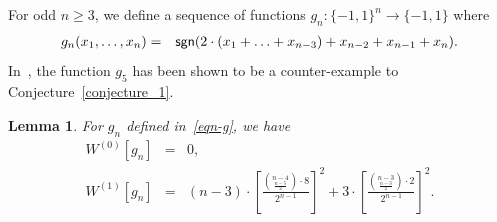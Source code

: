 \documentclass[11pt]{article}
\newtheorem{lemma} {Lemma}
\newcommand{\sym}[1]{{\sf #1}}
\begin{document}
For odd $n\geq 3$, we define a sequence of functions $g_n:\{-1,1\}^n\rightarrow\{-1,1\}$ where
\begin{eqnarray}\label{eqn-g}
	g_{n}(x_1,\ldots,x_n) & = & \sym{sgn}(2\cdot(x_1+\ldots+x_{n-3})+x_{n-2}+x_{n-1}+x_n).
\end{eqnarray}
In~\cite{jain2017counterexample}, the function $g_5$ has been shown to be a counter-example to Conjecture~\ref{conjecture_1}.
\begin{lemma}\label{our_lemma_1a}
	For $g_n$ defined in~\eqref{eqn-g}, we have
	\begin{eqnarray}
	{W}^{(0)}[g_n] & = & 0, \nonumber \\
	{W}^{(1)}[g_{n}] 
		& = & (n-3)\cdot \left[\frac{{n-4\choose \frac{n-5}{2}}\cdot 8}{2^{n-1}}\right]^2 + 3\cdot \left[\frac{{n-3\choose \frac{n-3}{2}}\cdot 2}{2^{n-1}}\right]^2.
				\label{eqn-W1g}
	\end{eqnarray}
\end{lemma}
\end{document}
